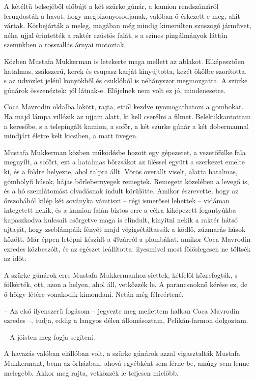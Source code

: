 \documentclass{IEEEtran}
\begin{document}
A kétéltű belsejéből előbújt a két szürke gúnár, a kamion rendszámáról
lerugdosták a havat, hogy megbizonyosodjanak, valóban ő érkezett-e meg, akit
vártak. Körbejárták a meleg, magában még mindig kimerülten szuszogó járművet,
néha ujjal érintették a raktér ezüstös falát, s a színes pingálmányok láttán
szemükben a rosszallás árnyai motoztak.

Közben Mustafa Mukkerman is letekerte maga mellett az ablakot. Elképesztően
hatalmas, zsákszerű, kerek és csupasz karját kinyújtotta, kezét ökölbe
szorította, s az üdvözlet jeléül könyökből és csuklóból is néhányszor
megmozgatta. A szürke gúnárok összenéztek: jól látnak-e. Előjelnek nem volt ez
jó, mindenesetre.

Coca Mavrodin oldalba lökött, rajta, ettől kezdve nyomogathatom a gombokat. Ha
majd lámpa villózik az ujjam alatt, ki kell cserélni a filmet.
Belekukkantottam a keresőbe, s a telepingált kamion, a sofőr, a két szürke
gúnár a két dobermannal mindjárt életre kelt kicsiben, a matt üvegen.

Mustafa Mukkerman közben működésbe hozott egy gépezetet, a vezetőfülke fala
megnyílt, a sofőrt, ezt a hatalmas bőrzsákot az üléssel együtt a szerkezet
emelte ki, és a földre helyezte, ahol talpra állt. Vörös overallt viselt,
alatta hatalmas, gömbölyű húsok, hájas bőrlebernyegek remegtek. Remegett
közelében a levegő is, és a hó szemlátomást olvadásnak indult körülötte.
Amikor észrevette, hogy az őrszobából kilép két soványka vámtiszt – régi
ismerősei lehettek – vidáman integetett nekik, és a kamion falán biztos erre a
célra kiképezett fogantyúkba kapaszkodva kulcsait csörgetve maga is elindult,
kinyitni nekik a raktér hátsó ajtaját, hogy zseblámpáik fényét majd
végigsétáltassák a ködlő, zúzmarás húsok között. Már éppen letépni készült a
49zárról a plombákat, amikor Coca Mavrodin ezredes közbeszólt, és az egészet
leállította: ilyesmivel most fölöslegesen ne töltsék az időt.

A szürke gúnárok erre Mustafa Mukkermanhoz siettek, kétfelől közrefogták, s
fölkérték, ott, azon a helyen, ahol áll, vetkőzzék le. A parancsnoknő kérése
ez, de ő hölgy létére vonakodik kimondani. Netán még félreértené.

– Az első ilyenszerű fogásom – jegyezte meg mellettem halkan Coca Mavrodin
ezredes –, tudja, eddig a langyos délen állomásoztam, Pelikán-farmon
dolgoztam.

– A jóisten meg fogja segíteni.

A havazás valóban elállóban volt, a szürke gúnárok azzal vigasztalták Mustafa
Mukkermant, benn az őrházban, ahová egyébként sem férne be, amúgy sem lenne
melegebb. Akkor meg rajta, vetkőzzék le teljesen mielőbb.
\end{document}
